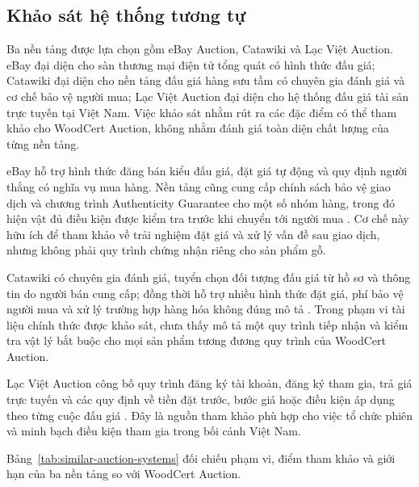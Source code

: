 \documentclass[../DoAn.tex]{subfiles}
\begin{document}
\subsection{Khảo sát hệ thống tương tự}

Ba nền tảng được lựa chọn gồm eBay Auction, Catawiki và Lạc Việt Auction. eBay đại diện cho sàn thương mại điện tử tổng quát có hình thức đấu giá; Catawiki đại diện cho nền tảng đấu giá hàng sưu tầm có chuyên gia đánh giá và cơ chế bảo vệ người mua; Lạc Việt Auction đại diện cho hệ thống đấu giá tài sản trực tuyến tại Việt Nam. Việc khảo sát nhằm rút ra các đặc điểm có thể tham khảo cho WoodCert Auction, không nhằm đánh giá toàn diện chất lượng của từng nền tảng.

eBay hỗ trợ hình thức đăng bán kiểu đấu giá, đặt giá tự động và quy định người thắng có nghĩa vụ mua hàng. Nền tảng cũng cung cấp chính sách bảo vệ giao dịch và chương trình Authenticity Guarantee cho một số nhóm hàng, trong đó hiện vật đủ điều kiện được kiểm tra trước khi chuyển tới người mua \cite{ebay-bidding,ebay-authenticity-guarantee,ebay-money-back-guarantee,ebay-resolving-issues}. Cơ chế này hữu ích để tham khảo về trải nghiệm đặt giá và xử lý vấn đề sau giao dịch, nhưng không phải quy trình chứng nhận riêng cho sản phẩm gỗ.

Catawiki có chuyên gia đánh giá, tuyển chọn đối tượng đấu giá từ hồ sơ và thông tin do người bán cung cấp; đồng thời hỗ trợ nhiều hình thức đặt giá, phí bảo vệ người mua và xử lý trường hợp hàng hóa không đúng mô tả \cite{catawiki-buyer,catawiki-experts,catawiki-bid-types,catawiki-safe-secure,catawiki-not-as-described}. Trong phạm vi tài liệu chính thức được khảo sát, chưa thấy mô tả một quy trình tiếp nhận và kiểm tra vật lý bắt buộc cho mọi sản phẩm tương đương quy trình của WoodCert Auction.

Lạc Việt Auction công bố quy trình đăng ký tài khoản, đăng ký tham gia, trả giá trực tuyến và các quy định về tiền đặt trước, bước giá hoặc điều kiện áp dụng theo từng cuộc đấu giá \cite{lacviet-home,lacviet-user-guide,lacviet-auction-notice,lacviet-auction-regulation}. Đây là nguồn tham khảo phù hợp cho việc tổ chức phiên và minh bạch điều kiện tham gia trong bối cảnh Việt Nam.

Bảng~\ref{tab:similar-auction-systems} đối chiếu phạm vi, điểm tham khảo và giới hạn của ba nền tảng so với WoodCert Auction.
\end{document}
